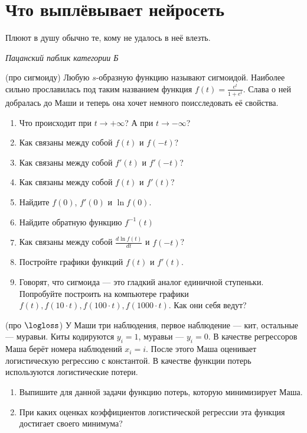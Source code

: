 
\section{Что выплёвывает нейросеть} 

\epigraph{Плюют в душу обычно те, кому не удалось в неё влезть.}{\textit{Пацанский паблик категории Б}}

\begin{problem}{(про сигмоиду)}
Любую $s$-образную функцию называют сигмоидой. Наиболее сильно прославилась под таким названием функция $f(t) = \frac{e^t}{1 + e^t}.$ Слава о ней добралась до Маши и теперь она хочет немного поисследовать её свойства. 

\begin{enumerate}
	\item Что происходит при $t \to +\infty$? А при $t \to -\infty$?
	\item Как связаны между собой $f(t)$ и  $f(-t)$?
	\item Как связаны между собой $f'(t)$ и  $f'(-t)$?
	\item Как связаны между собой $f(t)$ и $f'(t)$? 
	\item Найдите $f(0)$, $f'(0)$ и $\ln f(0)$.
	\item Найдите обратную функцию $f^{-1}(t)$
	\item Как связаны между собой $\frac{d\ln f(t)}{dt}$ и $f(-t)$?
	\item Постройте графики функций $f(t)$ и $f'(t)$.
	\item Говорят, что сигмоида --- это гладкий аналог единичной ступеньки. Попробуйте построить на компьютере графики $f(t), f(10\cdot t), f(100\cdot t), f(1000\cdot t)$. Как они себя ведут? 
	\end{enumerate}
\end{problem} 

\begin{problem}{(про $\logloss$)}
	У Маши три наблюдения, первое наблюдение --- кит, остальные --- муравьи. Киты кодируются $y_i = 1$, муравьи --- $y_i = 0$.  В качестве регрессоров Маша берёт номера наблюдений $x_i = i$. После этого Маша оценивает логистическую регрессию с константой. В качестве функции потерь используются логистические потери. 
	
	\begin{enumerate}
		\item Выпишите для данной задачи функцию потерь, которую минимизирует Маша.
		\item При каких оценках коэффициентов логистической регрессии эта функция достигает своего минимума?
	\end{enumerate}
\end{problem}

